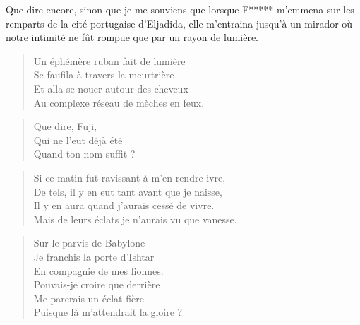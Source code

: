 \begin{prose}
  Que dire encore, sinon que je me souviens que lorsque F***** m’emmena sur les remparts de la cité portugaise d’Eljadida, elle m’entraina jusqu’à un mirador où notre intimité ne fût rompue que par un rayon de lumière.
\end{prose}

\begin{verse}%
  \quatrain%
  Un éphémère ruban fait de lumière\\  %
  Se faufila à travers la meurtrière\\  %
  Et alla se nouer autour des cheveux\\  %
  Au complexe réseau de mèches en feux.
\end{verse}

\begin{verse}%
  \haiku%
  Que dire, Fuji,\\  %
  Qui ne l’eut déjà été\\  %
  Quand ton nom suffit ?
\end{verse}

\begin{verse}%
  \quatrain%
  Si ce matin fut ravissant à m’en rendre ivre,\\  %
  De tels, il y en eut tant avant que je naisse,\\  %
  Il y en aura quand j’aurais cessé de vivre.\\  %
  Mais de leurs éclats je n’aurais vu que vanesse.
\end{verse}

\renewcommand\currentpoemtitle{En route vers le Falāĥ}%
\begin{verse}%
  \sizain%
  Sur le parvis de Babylone\\  %
  Je franchis la porte d’Ishtar\\  %
  En compagnie de mes lionnes.\\  %
  Pouvais-je croire que derrière\\  %
  Me parerais un éclat fière\\  %
  Puisque là m’attendrait la gloire ?
\end{verse}

